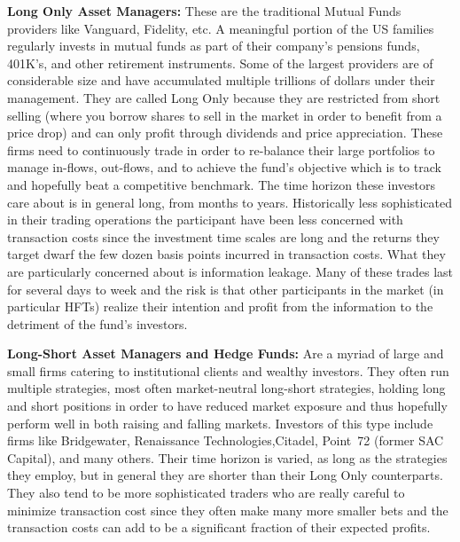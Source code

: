 \noindent\textbf{Long Only Asset Managers:} These are the traditional Mutual Funds providers like Vanguard, Fidelity, etc. A meaningful portion of the US families regularly invests in mutual funds  as part of their company's pensions funds, 401K's, and other retirement instruments. Some of the largest providers are of considerable size and have accumulated multiple trillions of dollars under their management. They are called Long Only because they are restricted from short selling (where you borrow shares to sell in the market in order to benefit from a price drop) and can only profit through dividends and price appreciation. These firms need to continuously trade in order to re-balance their large portfolios to manage in-flows, out-flows, and to achieve the fund's objective which is to track and hopefully beat a competitive benchmark. The time horizon these investors care about is in general long, from months to years. Historically less sophisticated in their trading operations the participant have been less concerned with transaction costs since the investment time scales are long and the returns they target dwarf the few dozen basis points incurred in transaction costs. What they are particularly concerned about is information leakage. Many of these trades last for several days to week and the risk is that  other participants in the market (in particular HFTs) realize their intention and profit from the information to the detriment of the fund's investors. \twomedskip

\noindent\textbf{Long-Short Asset Managers and Hedge Funds:} Are a myriad of large and small firms catering to institutional clients and wealthy investors. They often run multiple strategies, most often market-neutral long-short strategies, holding long and short positions in order to have reduced market exposure and  thus hopefully perform well in both raising and falling markets. Investors of this type include firms like Bridgewater, Renaissance Technologies,Citadel, Point~72 (former SAC Capital), and many others. Their time horizon is varied, as long as the strategies they employ, but in general they are shorter than their Long Only counterparts. They also tend to be more sophisticated traders who are really careful to minimize transaction cost since they often make many more smaller bets and the transaction costs can add to be a significant fraction of their expected profits. \twomedskip

